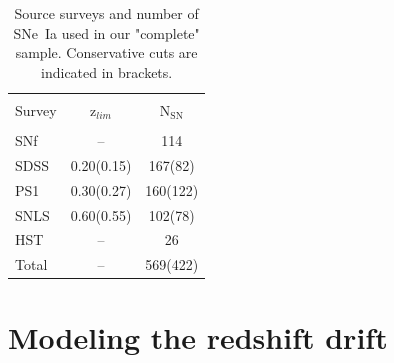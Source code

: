 \documentclass[]{aa} %
\newcommand{\mri}[1]{{\textcolor{red}{#1}}}
\newcommand{\nn}[1]{{\textcolor[rgb]{1, 0.27, 0}{#1}}}
\begin{document}
\begin{table}
    \centering
    \caption{\nn{Source surveys and number of SNe~Ia used in our "complete"
    sample. Conservative cuts are indicated in brackets.}}
    \label{tab:sample}
    \begin{tabular}{l c c}
    \hline\hline\\[-0.8em]
        Survey & z$_{lim}$ & N$_{\mathrm{SN}}$ \\[0.15em]
        \hline\\[-0.8em]
        SNf & -- & 114\\[0.30em]
        SDSS & 0.20(0.15) & 167(82)\\[0.30em]
        PS1 & 0.30(0.27) & 160(122)\\[0.30em]        
        SNLS & 0.60(0.55) & 102(78)\\[0.30em]
        HST & -- & 26\\[0.30em]
        Total & -- & 569(422)\\[0.30em]
        \hline
    \end{tabular}
\end{table}







\section{Modeling the redshift drift}
\label{sec:modeling}
\end{document}
